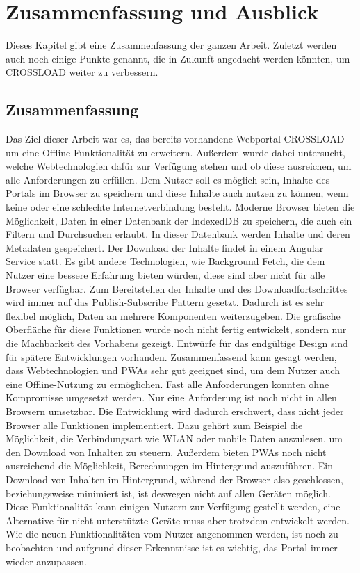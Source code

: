 \chapter{Zusammenfassung und Ausblick}
\label{Kap7}
Dieses Kapitel gibt eine Zusammenfassung der ganzen Arbeit. Zuletzt werden auch noch einige Punkte genannt, die in Zukunft angedacht werden könnten, um CROSSLOAD weiter zu verbessern.

\section{Zusammenfassung}
Das Ziel dieser Arbeit war es, das bereits vorhandene Webportal CROSSLOAD um eine Offline-Funktionalität zu erweitern. Außerdem wurde dabei untersucht, welche Webtechnologien dafür zur Verfügung stehen und ob diese ausreichen, um alle Anforderungen zu erfüllen. Dem Nutzer soll es möglich sein, Inhalte des Portals im Browser zu speichern und diese Inhalte auch nutzen zu können, wenn keine oder eine schlechte Internetverbindung besteht. Moderne Browser bieten die Möglichkeit, Daten in einer Datenbank der IndexedDB zu speichern, die auch ein Filtern und Durchsuchen erlaubt. In dieser Datenbank werden Inhalte und deren Metadaten gespeichert. Der Download der Inhalte findet in einem Angular Service statt. Es gibt andere Technologien, wie Background Fetch, die dem Nutzer eine bessere Erfahrung bieten würden, diese sind aber nicht für alle Browser verfügbar. Zum Bereitstellen der Inhalte und des Downloadfortschrittes wird immer auf das Publish-Subscribe Pattern gesetzt. Dadurch ist es sehr flexibel möglich, Daten an mehrere Komponenten weiterzugeben. Die grafische Oberfläche für diese Funktionen wurde noch nicht fertig entwickelt, sondern nur die Machbarkeit des Vorhabens gezeigt. Entwürfe für das endgültige Design sind für spätere Entwicklungen vorhanden. Zusammenfassend kann gesagt werden, dass Webtechnologien und \acp{PWA} sehr gut geeignet sind, um dem Nutzer auch eine Offline-Nutzung zu ermöglichen. Fast alle Anforderungen konnten ohne Kompromisse umgesetzt werden. Nur eine Anforderung ist noch nicht in allen Browsern umsetzbar. Die Entwicklung wird dadurch erschwert, dass nicht jeder Browser alle Funktionen implementiert. Dazu gehört zum Beispiel die Möglichkeit, die Verbindungsart wie WLAN oder mobile Daten auszulesen, um den Download von Inhalten zu steuern. Außerdem bieten \acp{PWA} noch nicht ausreichend die Möglichkeit, Berechnungen im Hintergrund auszuführen. Ein Download von Inhalten im Hintergrund, während der Browser also geschlossen, beziehungsweise minimiert ist, ist deswegen nicht auf allen Geräten möglich. Diese Funktionalität kann einigen Nutzern zur Verfügung gestellt werden, eine Alternative für nicht unterstützte Geräte muss aber trotzdem entwickelt werden. Wie die neuen Funktionalitäten vom Nutzer angenommen werden, ist noch zu beobachten und aufgrund dieser Erkenntnisse ist es wichtig, das Portal immer wieder anzupassen.


